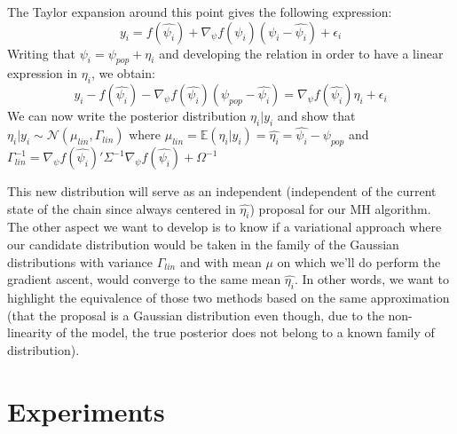 \documentclass{article}
\begin{document}
The Taylor expansion around this point gives the following expression:
\begin{equation}
y_{i} = f(\hat{\psi_i}) + \nabla_{\psi}f(\hat{\psi_i})(\psi_i - \hat{\psi_i}) + \epsilon_{i}
\end{equation}
Writing that $\psi_i = \psi_{pop} + \eta_i$ and developing the relation in order to have a linear expression in $\eta_i$, we obtain:
\begin{equation}
y_{i} - f(\hat{\psi_i}) - \nabla_{\psi}f(\hat{\psi_i})(\psi_{pop} - \hat{\psi_i}) = \nabla_{\psi}f(\hat{\psi_i})\eta_i + \epsilon_{i}
\end{equation}
We can now write the posterior distribution $\eta_i|y_i$ and show that  $\eta_i|y_i \sim \mathcal{N}(\mu_{lin},\Gamma_{lin})$ where
$\mu_{lin} = \mathbb{E}(\eta_i|y_i) = \hat{\eta_i} = \hat{\psi_i} - \psi_{pop}$ and $\Gamma_{lin}^{-1} = \nabla_{\psi}f(\hat{\psi_i})'\Sigma^{-1} \nabla_{\psi}f(\hat{\psi_i}) + \Omega^{-1}$ 

This new distribution will serve as an independent (independent of the current state of the chain since always centered in $\hat{\eta_i}$) proposal for our MH algorithm.\\
The other aspect we want to develop is to know if a variational approach where our candidate distribution would be taken in the family of the Gaussian distributions with variance $\Gamma_{lin}$ and with mean $\mu$ on which we'll do perform the gradient ascent, would converge to the same mean $\hat{\eta_i}$. In other words, we want to highlight the equivalence of those two methods based on the same approximation (that the proposal is a Gaussian distribution even though, due to the non-linearity of the model, the true posterior does not belong to a known family of distribution).

\section{Experiments} 
\end{document}
